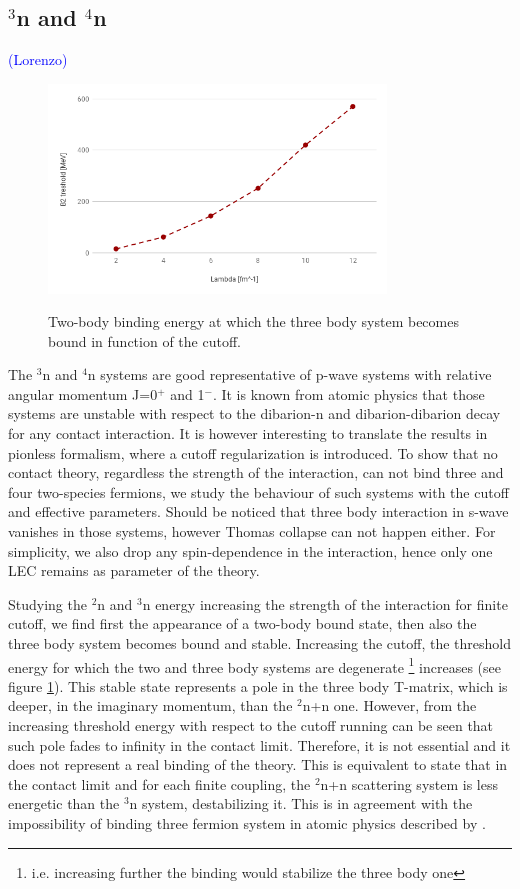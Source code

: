 \documentclass[onecolumn,preprint,nosuperscriptaddress,nofootinbib,12pt,linenumbers]{revtex4-1}
\newcommand{\blue}[1]{\textcolor{blue}{#1}}
\begin{document}
\subsection{$^3$n and $^4$n}
\blue{(Lorenzo)} 


\begin{figure}[h] 
\centering 
\includegraphics[width=0.8\textwidth]{./2b_3b_treshold} 
\label{fig:nnn_treshold}
\caption{Two-body binding energy at which the three body system becomes bound in function of the cutoff.} 
\end{figure} 

The $^3$n and $^4$n systems are good representative of p-wave systems with relative angular momentum J=0$^+$ and 1$^-$.
It is known from atomic physics that those systems are unstable with respect to the dibarion-n and dibarion-dibarion decay for any contact interaction. It is however interesting to translate the results in pionless formalism, where a cutoff regularization is introduced.
To show that no contact theory, regardless the strength of the interaction, can not bind three and four two-species fermions, we study the behaviour of such systems with the cutoff and effective parameters. Should be noticed that three body interaction in s-wave vanishes in those systems, however Thomas collapse can not happen either.
For simplicity, we also drop any spin-dependence in the interaction, hence only one LEC remains as parameter of the theory. 

Studying the $^2$n and $^3$n energy increasing the strength of the interaction for finite cutoff, we find first the appearance of a two-body bound state, then also the three body system becomes bound and stable. 
Increasing the cutoff, the threshold energy for which the two and three body systems are degenerate \footnote{ i.e. increasing further the binding would stabilize the three body one} increases (see figure \ref{fig:nnn_treshold}).
This stable state represents a pole in the three body T-matrix, which is deeper, in the imaginary momentum, than the $^2$n+n one.
However, from the increasing threshold energy with respect to the cutoff running can be seen that such pole fades to infinity in the contact limit. Therefore, it is not essential and it does not represent a real binding of the theory.
This is equivalent to state that in the contact limit and for each finite coupling, the $^2$n+n scattering system is less energetic than the $^3$n system, destabilizing it. 
This is in agreement with the impossibility of binding three fermion system in atomic physics described by \cite{Petrov}.
\end{document}

